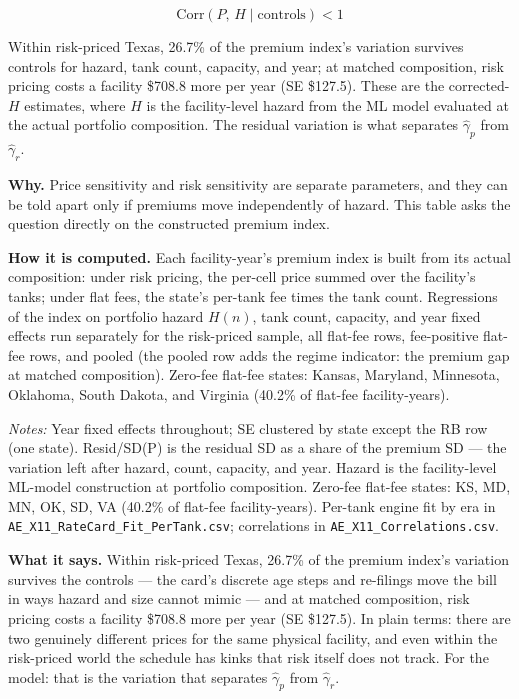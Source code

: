 \documentclass[
  letterpaper,
  DIV=11,
  numbers=noendperiod]{scrartcl}
\begin{document}
\[
\text{Corr}(P,\, H \mid \text{controls}) < 1
\]

Within risk-priced Texas, 26.7\% of the premium index's variation
survives controls for hazard, tank count, capacity, and year; at matched
composition, risk pricing costs a facility \$708.8 more per year (SE
\$127.5). These are the corrected-\(H\) estimates, where \(H\) is the
facility-level hazard from the ML model evaluated at the actual
portfolio composition. The residual variation is what separates
\(\hat\gamma_p\) from \(\hat\gamma_r\).

\textbf{Why.} Price sensitivity and risk sensitivity are separate
parameters, and they can be told apart only if premiums move
independently of hazard. This table asks the question directly on the
constructed premium index.

\textbf{How it is computed.} Each facility-year's premium index is built
from its actual composition: under risk pricing, the per-cell price
summed over the facility's tanks; under flat fees, the state's per-tank
fee times the tank count. Regressions of the index on portfolio hazard
\(H(n)\), tank count, capacity, and year fixed effects run separately
for the risk-priced sample, all flat-fee rows, fee-positive flat-fee
rows, and pooled (the pooled row adds the regime indicator: the premium
gap at matched composition). Zero-fee flat-fee states: Kansas, Maryland,
Minnesota, Oklahoma, South Dakota, and Virginia (40.2\% of flat-fee
facility-years).

\begin{table}[H]
\centering
\caption{Premium regressions: residual variation and the regime gap}

\par\vspace{4pt}
{\footnotesize\textit{Notes:} Year fixed effects throughout; SE clustered by
state except the RB row (one state). Resid/SD(P) is the residual SD as a share
of the premium SD --- the variation left after hazard, count, capacity, and year.
Hazard is the facility-level ML-model construction at portfolio composition.
Zero-fee flat-fee states: KS, MD, MN, OK, SD, VA (40.2\% of flat-fee
facility-years). Per-tank engine fit by era in
\texttt{AE\_X11\_RateCard\_Fit\_PerTank.csv}; correlations in
\texttt{AE\_X11\_Correlations.csv}.\par}
\end{table}

\textbf{What it says.} Within risk-priced Texas, 26.7\% of the premium
index's variation survives the controls --- the card's discrete age
steps and re-filings move the bill in ways hazard and size cannot mimic
--- and at matched composition, risk pricing costs a facility \$708.8
more per year (SE \$127.5). In plain terms: there are two genuinely
different prices for the same physical facility, and even within the
risk-priced world the schedule has kinks that risk itself does not
track. For the model: that is the variation that separates
\(\hat\gamma_p\) from \(\hat\gamma_r\).
\end{document}
